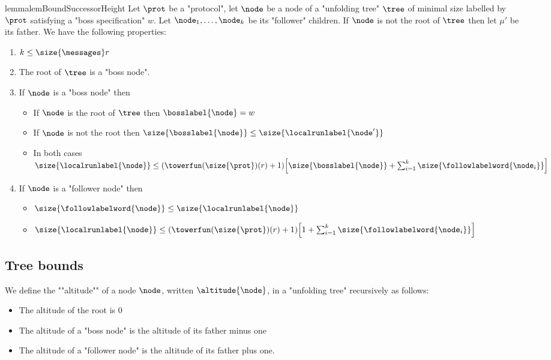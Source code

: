 \begin{restatable}{lemma}{lemBoundSuccessorHeight}
	\label{lem:bound-successor-height}
	Let $\prot$ be a "protocol", let $\node$ be a node of a "unfolding tree" $\tree$ of minimal size labelled by $\prot$ satisfying a "boss specification" $w$.
	Let $\node_1, \ldots, \node_k$ be its "follower" children. If $\node$ is not the root of $\tree$ then let $\mu'$ be its father.
	We have the following properties:
	
	\begin{enumerate}
		\item $k \leq \size{\messages}r$ 
		
		\item The root of $\tree$ is a "boss node".
				
		\item  If $\node$ is a "boss node" then 
		\begin{itemize}
			\item If $\node$ is the root of $\tree$ then $\bosslabel{\node} = w$
			
			\item If $\node$ is not the root then $\size{\bosslabel{\node}} \leq \size{\localrunlabel{\node'}}$
			
			\item In both cases $\size{\localrunlabel{\node}} \leq (\towerfun(\size{\prot})(r) + 1)\Big[ \size{\bosslabel{\node}} + \sum_{i=1}^k \size{\followlabelword{\node_i}} \Big]$
		\end{itemize}
	
		\item If $\node$ is a "follower node" then 
		\begin{itemize}			
			\item $\size{\followlabelword{\node}} \leq \size{\localrunlabel{\node}}$
			
			\item $\size{\localrunlabel{\node}} \leq (\towerfun(\size{\prot})(r) +1)\Big[ 1 + \sum_{i=1}^k \size{\followlabelword{\node_i}} \Big]$
			
		\end{itemize}
	\end{enumerate}
\end{restatable}


\subsection{Tree bounds}
\label{sec:tree-bounds}

\begin{definition}
	We define the ""altitude"" of a node $\node$, written $\altitude{\node}$, in a "unfolding tree" recursively as follows:
	\begin{itemize}
		\item The altitude of the root is $0$
		
		\item The altitude of a "boss node" is the altitude of its father minus one
		
		\item The altitude of a "follower node" is the altitude of its father plus one.
	\end{itemize}
\end{definition}

